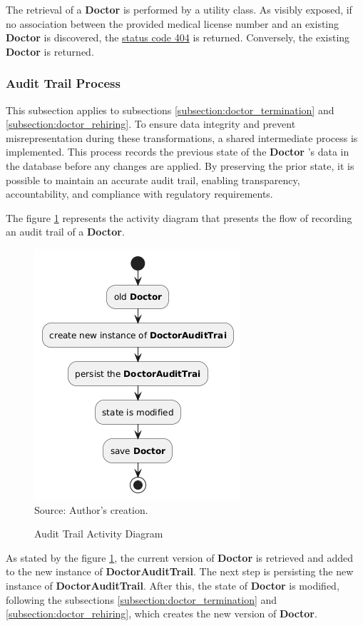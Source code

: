 The retrieval of a \textbf{Doctor} is performed by a utility class. As visibly exposed, if no association between the provided medical license number and an existing \textbf{Doctor} is discovered, the \hyperref[appendix:glossary]{status code 404} is returned. Conversely, the existing \textbf{Doctor} is returned.

\subsubsection{Audit Trail Process}
\label{subsection:doctor_audit_trail} 

This subsection applies to subsections \ref{subsection:doctor_termination} and \ref{subsection:doctor_rehiring}. To ensure data integrity and prevent misrepresentation during these transformations, a shared intermediate process is implemented. This process records the previous state of the \textbf{Doctor
}'s data in the database before any changes are applied. By preserving the prior state, it is possible to maintain an accurate audit trail, enabling transparency, accountability, and compliance with regulatory requirements.

The figure \ref{fig:audit_trail_activity_diagram} represents the activity diagram that presents the flow of recording an audit trail of a \textbf{Doctor}.

\begin{figure}[H]
	\centering
	\caption{Audit Trail Activity Diagram}
	\includegraphics[width=0.5\linewidth]{figures/doctor_audit_trail_activity_diagram.png}
	\label{fig:audit_trail_activity_diagram}
	\\ \footnotesize Source: Author's creation.
\end{figure}

As stated by the figure \ref{fig:audit_trail_activity_diagram}, the current version of \textbf{Doctor} is retrieved and added to the new instance of \textbf{DoctorAuditTrail}. The next step is persisting the new instance of \textbf{DoctorAuditTrail}. After this, the state of \textbf{Doctor} is modified, following the subsections \ref{subsection:doctor_termination} and \ref{subsection:doctor_rehiring}, which creates the new version of \textbf{Doctor}.

